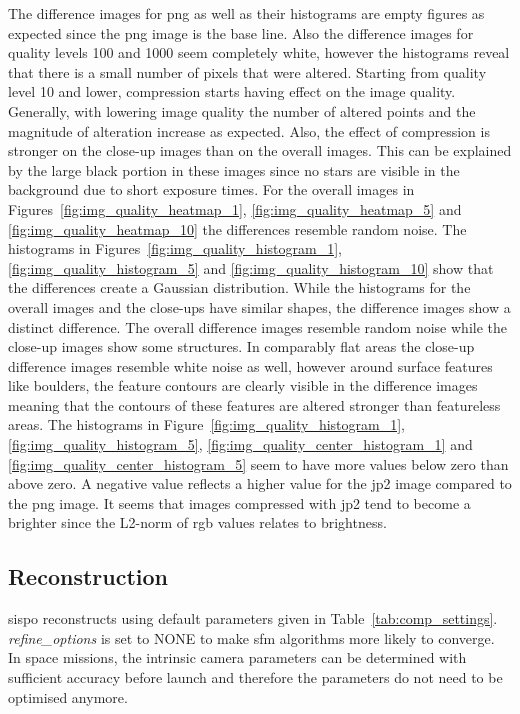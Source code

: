 The difference images for \gls{png} as well as their histograms are empty figures as expected since the \gls{png} image is the base line. Also the difference images for quality levels 100 and 1000 seem completely white, however the histograms reveal that there is a small number of pixels that were altered. 
Starting from quality level 10 and lower, compression starts having effect on the image quality. Generally, with lowering image quality the number of altered points and the magnitude of alteration increase as expected. Also, the effect of compression is stronger on the close-up images than on the overall images. This can be explained by the large black portion in these images since no stars are visible in the background due to short exposure times. For the overall images in Figures~\ref{fig:img_quality_heatmap_1}, \ref{fig:img_quality_heatmap_5} and \ref{fig:img_quality_heatmap_10} the differences resemble random noise. The histograms in Figures~\ref{fig:img_quality_histogram_1}, \ref{fig:img_quality_histogram_5} and \ref{fig:img_quality_histogram_10} show that the differences create a Gaussian distribution. While the histograms for the overall images and the close-ups have similar shapes, the difference images show a distinct difference. The overall difference images resemble random noise while the close-up images show some structures. In comparably flat areas the close-up difference images resemble white noise as well, however around surface features like boulders, the feature contours are clearly visible in the difference images meaning that the contours of these features are altered stronger than featureless areas.
The histograms in Figure~\ref{fig:img_quality_histogram_1}, \ref{fig:img_quality_histogram_5}, \ref{fig:img_quality_center_histogram_1} and \ref{fig:img_quality_center_histogram_5} seem to have more values below zero than above zero. A negative value reflects a higher value for the \gls{jp2} image compared to the \gls{png} image. It seems that images compressed with \gls{jp2} tend to become a brighter since the L2-norm of \gls{rgb} values relates to brightness.

\subsection{Reconstruction}
\gls{sispo} reconstructs using default parameters given in Table~\ref{tab:comp_settings}. \textit{refine\_options} is set to NONE to make \gls{sfm} algorithms more likely to converge. In space missions, the intrinsic camera parameters can be determined with sufficient accuracy before launch and therefore the parameters do not need to be optimised anymore.

